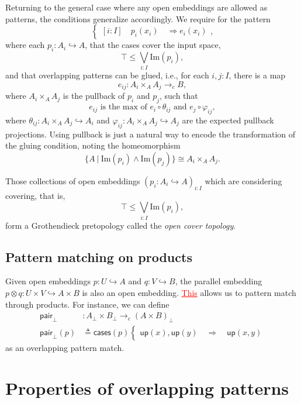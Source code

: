 \documentclass[conference]{IEEEtran}
\newcommand{\hookto}{\hookrightarrow}
\newcommand{\cto}{\to_c}
\newcommand{\suchthat}{\ |\ }
\newcommand{\Img}[1]{\text{Im}\left({#1}\right)}
\newcommand{\Branch}{\Rightarrow}
\newcommand{\up}{\mathsf{up}}
\newcommand{\isthemaxof}[3]{{#1}\text{ is the max of }{#2}\text{ and }{#3}}
\newcommand{\grammar}[1]{\textcolor{red}{\underline{#1}}}
\begin{document}
Returning to the general case where any open embeddings are allowed as patterns, the conditions generalize accordingly. We require for the pattern
\[
\begin{cases}
[i : I] \quad p_i(x_i) \quad \Branch e_i(x_i)
\end{cases},
\]
where each $p_i : A_i \hookto A$, that the cases cover the input space,
\[
\top \le \bigvee_{i : I} \Img{p_i},
\]
and that overlapping patterns can be glued, i.e., for each $i, j : I$, there is a map
\[
e_{ij} : A_i \times_A A_j \cto B,
\]
where $A_i \times_A A_j$ is the pullback of $p_i$ and $p_j$, such that 
\[
\isthemaxof{ e_{ij} }{ e_i \circ \theta_{ij}}{ e_j \circ \varphi_{ij}},
\]
where $\theta_{ij} : A_i \times_A A_j \hookto A_i$ and $\varphi_{ij} : A_i \times_A A_j \hookto A_j$ are the expected pullback projections. Using pullback is just a natural way to encode the transformation of the gluing condition, noting the homeomorphism
\[
 \{A \suchthat \Img{p_i} \wedge \Img{p_j} \} \cong A_i \times_A A_j.
\]

Those collections of open embeddings $\left( p_i : A_i \hookto A \right)_{i : I}$ which are considering covering, that is,
\[
\top \le \bigvee_{i : I} \Img{p_i},
\]
form a Grothendieck pretopology called the \emph{open cover topology}.

\subsection{Pattern matching on products}

Given open embeddings $p : U \hookto A$ and $q : V \hookto B$, the parallel embedding $p \otimes q : U \times V \hookto A \times B$ is also an open embedding. \grammar{This} allows us to pattern match through products. 
For instance, we can define
\begin{align*}
 \mathsf{pair}_\bot &: A_\bot \times B_\bot \cto \left( A \times B \right)_\bot
\\ \mathsf{pair}_\bot(p) &\triangleq \mathsf{cases}(p)
\begin{cases}
\up(x) , \up(y)
  \quad \Branch \quad \up(x, y)
\end{cases}
\end{align*}
as an overlapping pattern match.

\section{Properties of overlapping patterns}
\label{s:properties}
\end{document}

